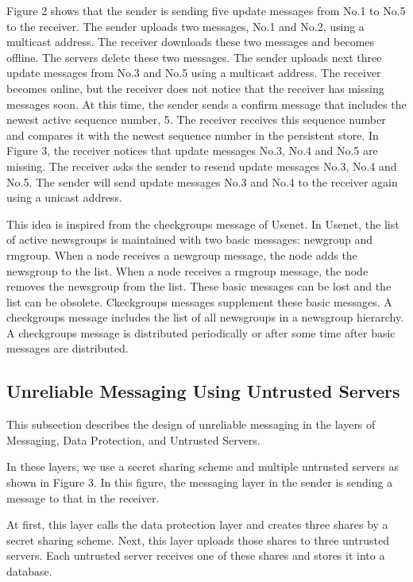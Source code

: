 \documentclass[twocolumn,10pt]{article}
\begin{document}
Figure 2 shows that the sender is sending five update messages from No.1 to No.5 to the receiver.
The sender uploads two messages, No.1 and No.2,  using a multicast address.
The receiver downloads these two messages and becomes offline.
The servers delete these two messages.
The sender uploads next three update messages from No.3 and No.5  using a multicast address.
The receiver becomes online, but the receiver does not notice that the receiver has missing messages soon.
At this time, the sender sends a confirm message that includes the newest active sequence number, 5.
The receiver receives this sequence number and compares it with the newest sequence number in the persistent store.
In Figure 3, the receiver notices that update messages No.3, No.4 and No.5 are missing.
The receiver asks the sender to resend update messages No.3, No.4 and No.5.
The sender will send update messages No.3 and No.4 to the receiver again using a unicast address.

This idea is inspired from the checkgroups message of Usenet\cite{usenet}.
In Usenet, the list of active newsgroups is maintained with two basic messages: newgroup and rmgroup.
When a node receives a newgroup message, the node adds the newsgroup to the list.
When a node receives a rmgroup message, the node removes the newsgroup from the list.
These basic messages can be lost and the list can be obsolete.
Ckeckgroups messages supplement these basic messages.
A checkgroups message includes the list of all newsgroups in a newsgroup hierarchy.
A checkgroups message is distributed periodically or after some time after basic messages are distributed.

\subsection{Unreliable Messaging Using Untrusted Servers}

This subsection describes the design of unreliable messaging in the layers of Messaging, Data Protection, and Untrusted Servers.

In these layers, we use a secret sharing scheme and multiple untrusted servers as shown in Figure 3.
In this figure, the messaging layer in the sender is sending a message to that in the receiver.

At first, this layer calls the data protection layer and creates three shares by a secret sharing scheme.
Next, this layer uploads those shares to three untrusted servers.
Each untrusted server receives one of these shares and stores it into a database.
\end{document}
